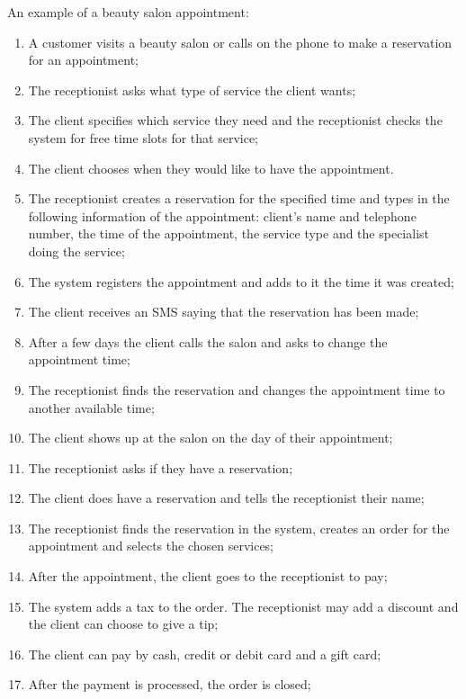 \documentclass[11pt,a4paper,pdftex]{article}
\begin{document}
An example of a beauty salon appointment:
\begin{enumerate}
    \item A customer visits a beauty salon or calls on the phone to make a reservation for an appointment;
    
    \item The receptionist asks what type of service the client wants;
    
    \item The client specifies which service they need and the receptionist checks the system for free time slots for that service;
    
    \item The client chooses when they would like to have the appointment.
    
    \item The receptionist creates a reservation for the specified time and types in the following information of the appointment: client's name and telephone number, the time of the appointment, the service type and the specialist doing the service;
    
    \item The system registers the appointment and adds to it the time it was created;
    
    \item The client receives an SMS saying that the reservation has been made;
    
    \item After a few days the client calls the salon and asks to change the appointment time;
    
    \item The receptionist finds the reservation and changes the appointment time to another available time;
    
    \item The client shows up at the salon on the day of their appointment;
    
    \item The receptionist asks if they have a reservation;
    
    \item The client does have a reservation and tells the receptionist their name;
    
    \item The receptionist finds the reservation in the system, creates an order for the appointment and selects the chosen services;
    
    \item After the appointment, the client goes to the receptionist to pay;
    
    \item The system adds a tax to the order. The receptionist may add a discount and the client can choose to give a tip;
    
    \item The client can pay by cash, credit or debit card and a gift card;
    
    \item After the payment is processed, the order is closed;
\end{enumerate}
\end{document}
